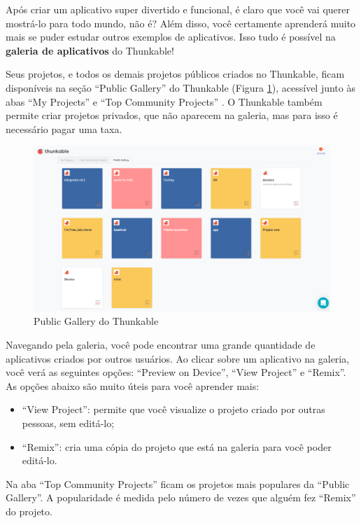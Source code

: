 \documentclass[11pt,fleqn]{book} %
\begin{document}
Após criar um aplicativo super divertido e funcional, é claro que você vai querer mostrá-lo para todo mundo, não é? Além disso, você certamente aprenderá muito mais se puder estudar outros exemplos de aplicativos. Isso tudo é possível na \textbf{galeria de aplicativos} do Thunkable!

Seus projetos, e todos os demais projetos públicos criados no Thunkable, ficam disponíveis na seção ``Public Gallery'' do Thunkable (Figura \ref{fig:gallery}), acessível junto às abas ``My Projects'' e ``Top Community Projects'' . O Thunkable também permite criar projetos privados, que não aparecem na galeria, mas para isso é necessário pagar uma taxa. 

\begin{figure}[H]
	\centering
    \includegraphics[width=\textwidth]{Pictures/GuiaThunkGallery.png}
    \caption{Public Gallery do Thunkable}\label{fig:gallery}
\end{figure}


Navegando pela galeria, você pode encontrar uma grande quantidade de aplicativos criados por outros usuários. Ao clicar sobre um aplicativo na galeria, você verá as seguintes opções: ``Preview on Device'', ``View Project'' e ``Remix''. As opções abaixo são muito úteis para você aprender mais:
\begin{itemize}
    \item ``View Project'': permite que você visualize o projeto criado por outras pessoas, sem editá-lo;
    \item ``Remix'': cria uma cópia do projeto que está na galeria para você poder editá-lo.
\end{itemize}

Na aba ``Top Community Projects'' ficam os projetos mais populares da ``Public Gallery''. A popularidade é medida pelo número de vezes que alguém fez ``Remix'' do projeto. 
\end{document}
